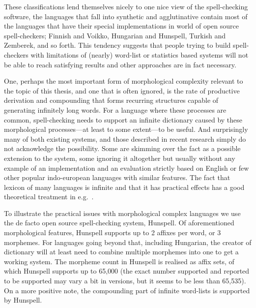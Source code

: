 \documentclass[officiallayout,draft]{unihelcompling}
\begin{document}
These classifications lend themselves nicely to one nice view of the
spell-checking software, the languages that fall into synthetic and
agglutinative contain most of the languages that have their special
implementations in world of open source spell-checkers; Finnish and Voikko,
Hungarian and Hunspell, Turkish and Zemberek, and so forth.  This tendency
suggests that people trying to build spell-checkers with limitations of
(nearly) word-list or statistics based systems will not be able to reach
satisfying results and other approaches are in fact necessary.

One, perhaps the most important form of morphological complexity relevant to
the topic of this thesis, and one that is often ignored, is the rate of
productive derivation and compounding that forms recurring structures capable
of generating infinitely long words. For a language where these processes are
common, spell-checking needs to support an infinite dictionary caused by these
morphological processes---at least to some extent---to be useful. And
surprisingly many of both existing systems, and those described in recent
research simply do not acknowledge the possibility. Some are skimming over the
fact as a possible extension to the system, some ignoring it altogether but
usually without any example of an implementation and an evaluation strictly
based on English or few other popular indo-european languages with similar
features.  The fact that lexicon of many languages is infinite and that it has
practical effects has a good theoretical treatment in
e.g.~\citet{kornai2002many}.

To illustrate the practical issues with morphological complex languages we use
the de facto open source spell-checking system, Hunspell. Of aforementioned
morphological features, Hunspell supports up to 2 affixes per word, or 3
morphemes. For languages going beyond that, including Hungarian, the creator of
dictionary will at least need to combine multiple morphemes into one to get a
working system. The morpheme count in Hunspell is realised as affix sets, of
which Hunspell supports up to 65,000 (the exact number supported and reported
to be supported may vary a bit in versions, but it seems to be less than
65,535). On a more positive note, the compounding part of infinite word-lists
is supported by Hunspell.
\end{document}
